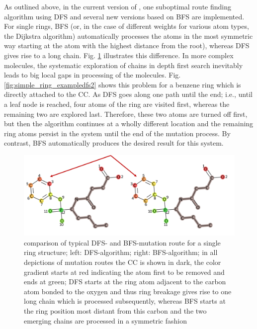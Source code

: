As outlined above, in the current version of {\trafo}, one suboptimal route finding algorithm using DFS and several new versions based on BFS are implemented.
For single rings, BFS (or, in the case of different weights for various atom types, the Dijkstra algorithm) automatically processes the atoms in the most symmetric way starting at the atom with the highest distance from the root), whereas DFS gives rise to a long chain. Fig. \ref{fig:comparison_dfs_bfs} illustrates this difference.
In more complex molecules, the systematic exploration of chains in
depth first search inevitably leads to big local gaps in processing
of the molecules. Fig. \ref{fig:simple_ring_exampledfs2} shows this problem for a benzene ring which
is directly attached to the CC. As DFS goes along one path
until the end; i.e., until a leaf node is reached, four atoms of the
ring are visited first, whereas the remaining two are explored
last. Therefore, these two atoms are turned off first, but then the
algorithm continues at a wholly different location and the remaining
ring atoms persist in the system until the end of the mutation process.
By contrast, BFS automatically produces the desired result for this system. 


\begin{figure}
\includegraphics[scale=1.4]{simple_ring_exampledfs.png}

\caption{comparison of typical DFS- and BFS-mutation route for a single ring structure; left: DFS-algorithm; right: BFS-algorithm; in all depictions of mutation routes the CC is shown in dark, the color gradient starts at red indicating the atom first to be removed and ends at green; DFS
starts at the ring atom adjacent to the carbon atom bonded to the oxygen and thus ring breakage gives rise to one long
chain which is processed subsequently, whereas BFS starts at the ring position most distant from this carbon and the two emerging chains are processed in a symmetric fashion
}
\label{fig:comparison_dfs_bfs}
\end{figure}



